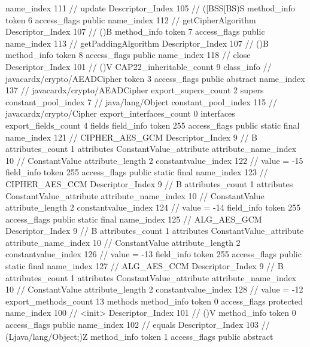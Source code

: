 {{{{{					name_index	111		// update
					Descriptor_Index	105		// ([BSS[BS)S
				}
				method_info {
					token	6
					access_flags	public
					name_index	112		// getCipherAlgorithm
					Descriptor_Index	107		// ()B
				}
				method_info {
					token	7
					access_flags	public
					name_index	113		// getPaddingAlgorithm
					Descriptor_Index	107		// ()B
				}
				method_info {
					token	8
					access_flags	public
					name_index	118		// close
					Descriptor_Index	101		// ()V
				}
			}
			CAP22_inheritable_count	9
		}
		class_info {		// javacardx/crypto/AEADCipher
			token	3
			access_flags	public abstract
			name_index	137		// javacardx/crypto/AEADCipher
			export_supers_count	2
			supers {
				constant_pool_index	7		// java/lang/Object
				constant_pool_index	115		// javacardx/crypto/Cipher
			}
			export_interfaces_count	0
			interfaces {
			}
			export_fields_count	4
			fields {
			field_info {
				token	255
				access_flags	public static final
				name_index	121		// CIPHER_AES_GCM
				Descriptor_Index	9		// B
				attributes_count	1
				attributes {
				ConstantValue_attribute {
					attribute_name_index	10		// ConstantValue
					attribute_length	2
					constantvalue_index	122		// value = -15
				}
				}
			}
			field_info {
				token	255
				access_flags	public static final
				name_index	123		// CIPHER_AES_CCM
				Descriptor_Index	9		// B
				attributes_count	1
				attributes {
				ConstantValue_attribute {
					attribute_name_index	10		// ConstantValue
					attribute_length	2
					constantvalue_index	124		// value = -14
				}
				}
			}
			field_info {
				token	255
				access_flags	public static final
				name_index	125		// ALG_AES_GCM
				Descriptor_Index	9		// B
				attributes_count	1
				attributes {
				ConstantValue_attribute {
					attribute_name_index	10		// ConstantValue
					attribute_length	2
					constantvalue_index	126		// value = -13
				}
				}
			}
			field_info {
				token	255
				access_flags	public static final
				name_index	127		// ALG_AES_CCM
				Descriptor_Index	9		// B
				attributes_count	1
				attributes {
				ConstantValue_attribute {
					attribute_name_index	10		// ConstantValue
					attribute_length	2
					constantvalue_index	128		// value = -12
				}
				}
			}
			}
			export_methods_count	13
			methods {
				method_info {
					token	0
					access_flags	protected
					name_index	100		// <init>
					Descriptor_Index	101		// ()V
				}
				method_info {
					token	0
					access_flags	public
					name_index	102		// equals
					Descriptor_Index	103		// (Ljava/lang/Object;)Z
				}
				method_info {
					token	1
					access_flags	public abstract
}}}}}
